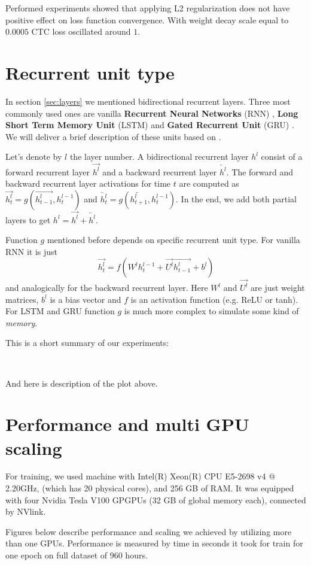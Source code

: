 \documentclass[licencjacka,en]{pracamgr}
\newcommand{\todoplot}[1]{
\ \\
\noindent%
\begin{minipage}{\linewidth}%
\makebox[\linewidth]{%
		\begin{tikzpicture}
		\begin{axis}[
            ymin = 0, ymax = 5,
            xmin = 0, xmax = 600,
            minor y tick num = 4,
            minor x tick num = 1,
            ymajorgrids = true,
            grid style = dashed,
            scaled x ticks = false,
            xlabel = TODO,
            ylabel = TODO,
            legend pos=outer north east,
            no markers
          ]
		  \addplot table[x=epochs,y=training]{\first};
		  \addlegendentry{TODO}

		\end{axis}
		\end{tikzpicture}
		}\captionof{figure}{#1}\label{diag:time}     
\end{minipage}
}
\begin{document}
Performed experiments showed that applying L2 regularization does not have positive effect on loss function convergence. With weight decay scale equal to $0.0005$ CTC loss oscillated around $1$.

\section{Recurrent unit type}
In section \ref{sec:layers} we mentioned bidirectional recurrent layers. Three most commonly used ones are vanilla \textbf{Recurrent Neural Networks} (RNN) \cite{RNN}, \textbf{Long Short Term Memory Unit} (LSTM) \cite{LSTM} and \textbf{Gated Recurrent Unit} (GRU) \cite{GRU}. We will deliver a brief description of these units based on \cite{DS2}.

Let's denote by $l$ the layer number. A bidirectional recurrent layer $h^l$ consist of a forward recurrent layer $\overrightarrow{h^l}$ and a backward recurrent layer $\overleftarrow{h^l}$. The forward and backward recurrent layer activations for time $t$ are computed as $\overrightarrow{h^l_t} = g(\overrightarrow{h^l_{t - 1}}, h^{l-1}_t)$ and $\overleftarrow{h^l_t} = g(\overleftarrow{h^l_{t+1}}, h^{l-1}_t)$. In the end, we add both partial layers to get $h^l = \overrightarrow{h^l} + \overleftarrow{h^l}$.

Function $g$ mentioned before depends on specific recurrent unit type. For vanilla RNN it is just
$$\overrightarrow{h^l_t} = f(W^l h^{l-1}_t + \overrightarrow{U^l} \overrightarrow{h^l_{t - 1}} + b^l)$$
and analogically for the backward recurrent layer. Here $W^l$ and $\overrightarrow{U^l}$ are just weight matrices, $b^l$ is a bias vector and $f$ is an activation function (e.g. ReLU or tanh). For LSTM and GRU function $g$ is much more complex to simulate some kind of \textit{memory}.

This is a short summary of our experiments:

\todoplot{TODO}


And here is description of the plot above.

\section{Performance and multi GPU scaling}
For training, we used machine with Intel(R) Xeon(R) CPU E5-2698 v4 @ 2.20GHz, (which has 20 physical cores), and 256 GB of RAM. It was equipped with four Nvidia Tesla V100 GPGPUs (32 GB of global memory each), connected by NVlink.

Figures below describe performance and scaling we achieved by utilizing more than one GPUs. Performance is measured by time in seconds it took for train for one epoch on full dataset of 960 hours.
\end{document}

